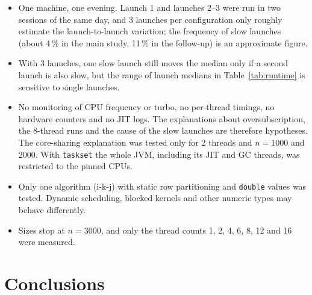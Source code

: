 \documentclass[11pt,a4paper]{article}
\newcommand{\code}[1]{\texttt{#1}}
\begin{document}
\begin{itemize}
  \item One machine, one evening. Launch 1 and launches 2--3 were run in two sessions of the same day, and 3 launches per configuration only roughly estimate the launch-to-launch variation; the frequency of slow launches (about 4\,\% in the main study, 11\,\% in the follow-up) is an approximate figure.
  \item With 3 launches, one slow launch still moves the median only if a second launch is also slow, but the range of launch medians in Table~\ref{tab:runtime} is sensitive to single launches.
  \item No monitoring of CPU frequency or turbo, no per-thread timings, no hardware counters and no JIT logs. The explanations about oversubscription, the 8-thread runs and the cause of the slow launches are therefore hypotheses. The core-sharing explanation was tested only for 2 threads and $n = 1000$ and 2000. With \code{taskset} the whole JVM, including its JIT and GC threads, was restricted to the pinned CPUs.
  \item Only one algorithm (i-k-j) with static row partitioning and \code{double} values was tested. Dynamic scheduling, blocked kernels and other numeric types may behave differently.
  \item Sizes stop at $n = 3000$, and only the thread counts 1, 2, 4, 6, 8, 12 and 16 were measured.
\end{itemize}

\section{Conclusions}
\end{document}
